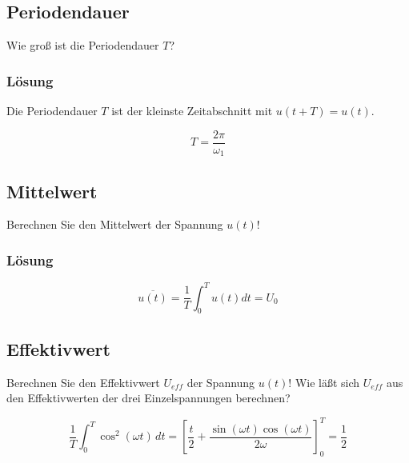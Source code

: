 \documentclass[
  ngerman,
  letterpaper,
]{scrbook}
\begin{document}
\subsection{Periodendauer}\label{periodendauer}

Wie groß ist die Periodendauer \(T\)?

\subsubsection{Lösung}\label{luxf6sung-1}

Die Periodendauer \(T\) ist der kleinste Zeitabschnitt mit
\(u(t+T)=u(t)\).

\[
T = \frac{2 \pi}{\omega_1}
\]

\subsection{Mittelwert}\label{mittelwert}

Berechnen Sie den Mittelwert der Spannung \(u(t)\)!

\subsubsection{Lösung}\label{luxf6sung-2}

\[
\overline{u(t)} = \frac{1}{T} \int_0^T u(t) dt = U_0
\]

\subsection{Effektivwert}\label{effektivwert}

Berechnen Sie den Effektivwert \(U_{eff}\) der Spannung \(u(t)\)! Wie
läßt sich \(U_{eff}\) aus den Effektivwerten der drei Einzelspannungen
berechnen?

\begin{tcolorbox}[enhanced jigsaw, titlerule=0mm, rightrule=.15mm, toprule=.15mm, colback=white, toptitle=1mm, bottomrule=.15mm, coltitle=black, leftrule=.75mm, arc=.35mm, colbacktitle=quarto-callout-tip-color!10!white, opacityback=0, bottomtitle=1mm, colframe=quarto-callout-tip-color-frame, opacitybacktitle=0.6, breakable, title=\textcolor{quarto-callout-tip-color}{\faLightbulb}\hspace{0.5em}{Tipp}, left=2mm]

\[
\frac{1}{T}\int_0^T \cos^2(\omega t)\, dt = \left[ \frac{t}{2} 
+ \frac{\sin(\omega t) \cos(\omega t)}{2 \omega} \right]_0^T 
= \frac{1}{2}
\]

\end{tcolorbox}
\end{document}
